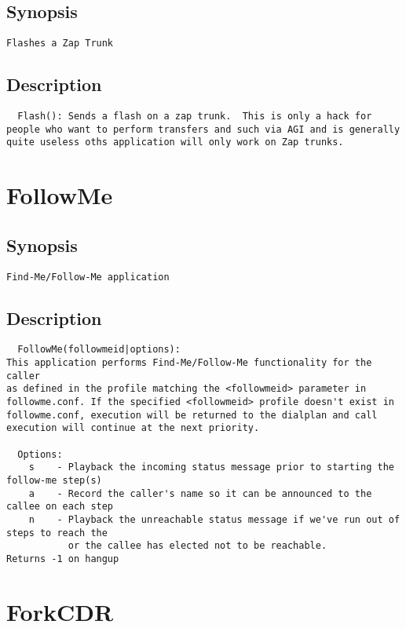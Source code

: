 \subsection{Synopsis}
\begin{verbatim}
Flashes a Zap Trunk
\end{verbatim}
\subsection{Description}
\begin{verbatim}
  Flash(): Sends a flash on a zap trunk.  This is only a hack for
people who want to perform transfers and such via AGI and is generally
quite useless oths application will only work on Zap trunks.

\end{verbatim}


\section{FollowMe}
\subsection{Synopsis}
\begin{verbatim}
Find-Me/Follow-Me application
\end{verbatim}
\subsection{Description}
\begin{verbatim}
  FollowMe(followmeid|options):
This application performs Find-Me/Follow-Me functionality for the caller
as defined in the profile matching the <followmeid> parameter in
followme.conf. If the specified <followmeid> profile doesn't exist in
followme.conf, execution will be returned to the dialplan and call
execution will continue at the next priority.

  Options:
    s    - Playback the incoming status message prior to starting the follow-me step(s)
    a    - Record the caller's name so it can be announced to the callee on each step
    n    - Playback the unreachable status message if we've run out of steps to reach the
           or the callee has elected not to be reachable.
Returns -1 on hangup

\end{verbatim}


\section{ForkCDR}
